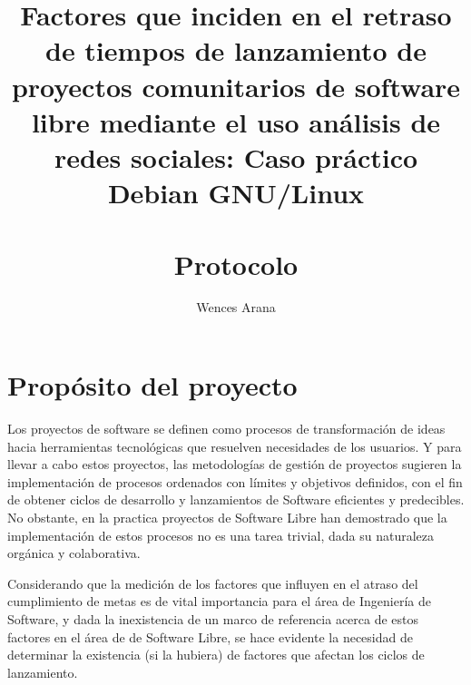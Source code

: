 \documentclass[letterpaper,12pt,titlepage]{report}
\begin{document}
\linespread{1.2}
\setlength{\textwidth}{430pt}                                                         


 \title{ {Factores que inciden en el retraso de  tiempos de lanzamiento de
    proyectos comunitarios de software libre mediante el uso  análisis de
    redes sociales: Caso pr\'actico Debian GNU/Linux} \\ \\ {Protocolo} }
\author{Wences Arana}  
\maketitle

\tableofcontents
\renewcommand{\chaptername}{}%
\renewcommand{\thechapter}{}%

\setcounter{section}{0} \cleardoublepage

\chapter{Propósito del proyecto}

Los proyectos de software se definen como procesos de transformación
de ideas hacia herramientas tecnológicas que resuelven necesidades de
los usuarios. Y para llevar a cabo estos proyectos, las metodologías
de gestión de proyectos sugieren la implementación de procesos
ordenados con límites y objetivos definidos, con el fin de obtener
ciclos de desarrollo y lanzamientos de Software eficientes y
predecibles.  No obstante, en la practica proyectos de Software Libre
han demostrado que la implementación de estos procesos no es una tarea
trivial, dada su naturaleza orgánica y colaborativa.

Considerando que la medición de los factores que
influyen en el atraso del cumplimiento de metas es de vital
importancia para el área de Ingeniería de Software, y dada la
inexistencia de un marco de referencia acerca de estos factores en el
área de de Software Libre, se hace evidente la necesidad de determinar
la existencia (si la hubiera) de factores que afectan los ciclos de
lanzamiento.
\end{document}
